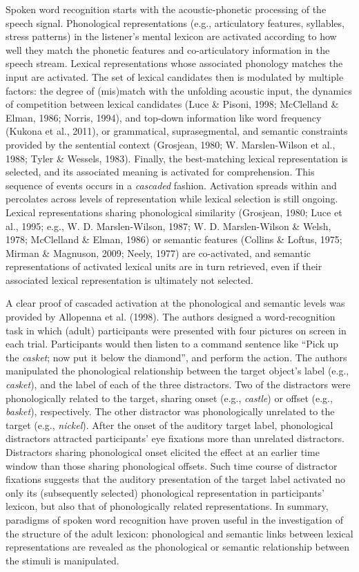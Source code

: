 \documentclass[
  12pt,
  b5paperpaper,
  twoside]{scrreprt}
\begin{document}
Spoken word recognition starts with the acoustic-phonetic processing of
the speech signal. Phonological representations (e.g., articulatory
features, syllables, stress patterns) in the listener's mental lexicon
are activated according to how well they match the phonetic features and
co-articulatory information in the speech stream. Lexical
representations whose associated phonology matches the input are
activated. The set of lexical candidates then is modulated by multiple
factors: the degree of (mis)match with the unfolding acoustic input, the
dynamics of competition between lexical candidates (Luce \& Pisoni,
1998; McClelland \& Elman, 1986; Norris, 1994), and top-down information
like word frequency (Kukona et al., 2011), or grammatical,
suprasegmental, and semantic constraints provided by the sentential
context (Grosjean, 1980; W. Marslen-Wilson et al., 1988; Tyler \&
Wessels, 1983). Finally, the best-matching lexical representation is
selected, and its associated meaning is activated for comprehension.
This sequence of events occurs in a \emph{cascaded} fashion. Activation
spreads within and percolates across levels of representation while
lexical selection is still ongoing. Lexical representations sharing
phonological similarity (Grosjean, 1980; Luce et al., 1995; e.g., W. D.
Marslen-Wilson, 1987; W. D. Marslen-Wilson \& Welsh, 1978; McClelland \&
Elman, 1986) or semantic features (Collins \& Loftus, 1975; Mirman \&
Magnuson, 2009; Neely, 1977) are co-activated, and semantic
representations of activated lexical units are in turn retrieved, even
if their associated lexical representation is ultimately not selected.

A clear proof of cascaded activation at the phonological and semantic
levels was provided by Allopenna et al. (1998). The authors designed a
word-recognition task in which (adult) participants were presented with
four pictures on screen in each trial. Participants would then listen to
a command sentence like ``Pick up the \emph{casket}; now put it below
the diamond'', and perform the action. The authors manipulated the
phonological relationship between the target object's label (e.g.,
\emph{casket}), and the label of each of the three distractors. Two of
the distractors were phonologically related to the target, sharing onset
(e.g., \emph{castle}) or offset (e.g., \emph{basket}), respectively. The
other distractor was phonologically unrelated to the target (e.g.,
\emph{nickel}). After the onset of the auditory target label,
phonological distractors attracted participants' eye fixations more than
unrelated distractors. Distractors sharing phonological onset elicited
the effect at an earlier time window than those sharing phonological
offsets. Such time course of distractor fixations suggests that the
auditory presentation of the target label activated no only its
(subsequently selected) phonological representation in participants'
lexicon, but also that of phonologically related representations. In
summary, paradigms of spoken word recognition have proven useful in the
investigation of the structure of the adult lexicon: phonological and
semantic links between lexical representations are revealed as the
phonological or semantic relationship between the stimuli is
manipulated.
\end{document}
